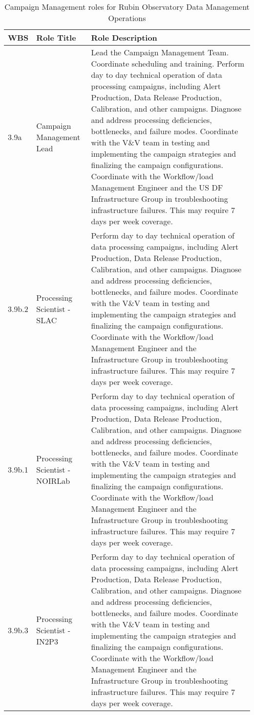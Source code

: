 \normalsize \begin{longtable} {|p{}|p{}|p{}|} \caption{Campaign Management roles for Rubin Observatory Data Management Operations \label{tab:cmroles}}\\ 
\hline 
\textbf{WBS}&\textbf{Role Title}&\textbf{Role Description} \\ \hline
{3.9a}&{Campaign Management Lead}&{Lead the Campaign Management Team. Coordinate scheduling and training. Perform day to day technical operation of data processing campaigns, including Alert Production, Data Release Production, Calibration, and other campaigns. Diagnose and address processing deficiencies, bottlenecks, and failure modes. Coordinate with the V\&V team in testing and implementing the campaign strategies and finalizing the campaign configurations. Coordinate with the Workflow/load Management Engineer and the US DF Infrastructure Group in troubleshooting infrastructure failures. This may require 7 days per week coverage.} \\ \hline
{3.9b.2}&{Processing Scientist - SLAC}&{Perform day to day technical operation of data processing campaigns, including Alert Production, Data Release Production, Calibration, and other campaigns. Diagnose and address processing deficiencies, bottlenecks, and failure modes. Coordinate with the V\&V team in testing and implementing the campaign strategies and finalizing the campaign configurations. Coordinate with the Workflow/load Management Engineer and the Infrastructure Group in troubleshooting infrastructure failures. This may require 7 days per week coverage.} \\ \hline
{3.9b.1}&{Processing Scientist - NOIRLab}&{Perform day to day technical operation of data processing campaigns, including Alert Production, Data Release Production, Calibration, and other campaigns. Diagnose and address processing deficiencies, bottlenecks, and failure modes. Coordinate with the V\&V team in testing and implementing the campaign strategies and finalizing the campaign configurations. Coordinate with the Workflow/load Management Engineer and the Infrastructure Group in troubleshooting infrastructure failures. This may require 7 days per week coverage.} \\ \hline
{3.9b.3}&{Processing Scientist - IN2P3}&{Perform day to day technical operation of data processing campaigns, including Alert Production, Data Release Production, Calibration, and other campaigns. Diagnose and address processing deficiencies, bottlenecks, and failure modes. Coordinate with the V\&V team in testing and implementing the campaign strategies and finalizing the campaign configurations. Coordinate with the Workflow/load Management Engineer and the Infrastructure Group in troubleshooting infrastructure failures. This may require 7 days per week coverage.} \\ \hline

\end{longtable}
